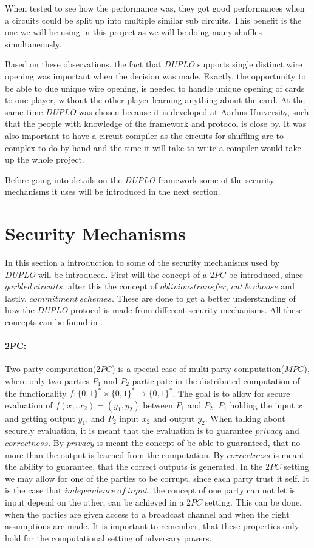 \documentclass[twoside,11pt,openright]{report}
\newcommand{\DUPLO}{\textit{DUPLO} }
\begin{document}
When tested to see how the performance was, they got good performances when a circuits could be split up into multiple similar sub circuits. This benefit is the one we will be using in this project as we will be doing many shuffles simultaneously.

\bigskip

Based on these observations, the fact that \DUPLO supports single distinct wire opening was important when the decision was made. Exactly, the opportunity to be able to due unique wire opening, is needed to handle unique opening of cards to one player, without the other player learning anything about the card. At the same time \DUPLO was chosen because it is developed at Aarhus University, such that the people with knowledge of the framework and protocol is close by. It was also important to have a circuit compiler as the circuits for shuffling are to complex to do by hand and the time it will take to write a compiler would take up the whole project.

\bigskip

Before going into details on the \DUPLO framework some of the security mechanisms it uses will be introduced in the next section.

\section{Security Mechanisms}
In this section a introduction to some of the security mechanisms used by \DUPLO will be introduced. First will the concept of a $2PC$ be introduced, since $garbled~circuits$, after this the concept of $oblivious transfer$, $cut~\&~choose$ and lastly, $commitment~schemes$. These are done to get a better understanding of how the \DUPLO protocol is made from different security mechanisms. All these concepts can be found in \cite{estpp}.

\paragraph{2PC:}
Two party computation($2PC$) is a special case of multi party computation($MPC$), where only two parties $P_1$ and $P_2$ participate in the distributed computation of the functionality $f: \{0,1\}^* \times \{0,1\}^* \to \{0,1\}^*$. The goal is to allow for secure evaluation of $f(x_1,x_2)=(y_1,y_2)$ between $P_1$ and $P_2$. $P_1$ holding the input $x_1$ and getting output $y_1$, and $P_2$ input $x_2$ and output $y_2$. When talking about securely evaluation, it is meant that the evaluation is to guarantee $privacy$ and $correctness$. By $privacy$ is meant the concept of be able to guaranteed, that no more than the output is learned from the computation. By $correctness$ is meant the ability to guarantee, that the correct outputs is generated. In the $2PC$ setting we may allow for one of the parties to be corrupt, since each party trust it self. It is the case that $independence~of~input$, the concept of one party can not let is input depend on the other, can be achieved in a $2PC$ setting. This can be done, when the parties are given access to a broadcast channel and when the right assumptions are made. It is important to remember, that these properties only hold for the computational setting of adversary powers.
\end{document}
